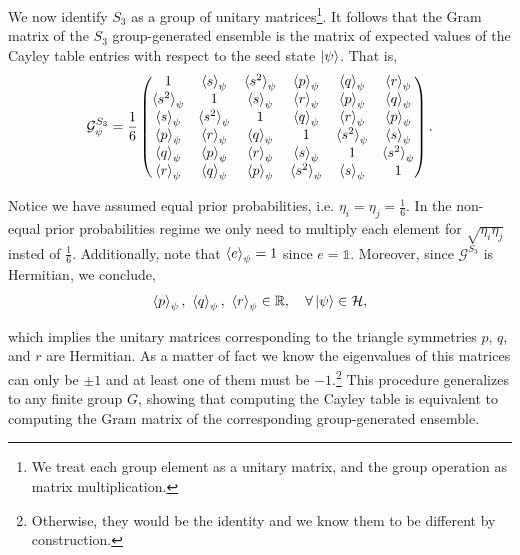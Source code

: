 \documentclass[12pt,letterpaper]{article}
\begin{document}
We now identify $S_3$ as a group of unitary matrices\footnote{We treat each group element as a unitary matrix, and the group operation as matrix multiplication.}. It follows that the Gram matrix of the $S_3$ group-generated ensemble is the matrix of expected values of the Cayley table entries with respect to the seed state $\ket{\psi}$. That is,
\begin{align*}
	\mathcal{G}^{S_3}_{\psi} = \frac{1}{6}\begin{pmatrix}
        1 & \braket{s}_\psi & \braket{s^2}_\psi & \braket{p}_\psi & \braket{q}_\psi & \braket{r}_\psi \\ 
        \braket{s^2}_\psi & 1 & \braket{s}_\psi & \braket{r}_\psi & \braket{p}_\psi & \braket{q}_\psi \\
        \braket{s}_\psi & \braket{s^2}_\psi & 1 & \braket{q}_\psi & \braket{r}_\psi & \braket{p}_\psi \\
        \braket{p}_\psi & \braket{r}_\psi & \braket{q}_\psi & 1 & \braket{s^2}_\psi & \braket{s}_\psi \\
        \braket{q}_\psi & \braket{p}_\psi & \braket{r}_\psi & \braket{s}_\psi & 1 & \braket{s^2}_\psi \\
        \braket{r}_\psi & \braket{q}_\psi & \braket{p}_\psi & \braket{s^2}_\psi & \braket{s}_\psi & 1
	\end{pmatrix}.
\end{align*}

Notice we have assumed equal prior probabilities, i.e. $\eta_i = \eta_j = \frac{1}{6}$. In the non-equal prior probabilities regime we only need to multiply each element for $\sqrt{\eta_i\eta_j}$ insted of $\frac{1}{6}$. Additionally, note that $\braket{e}_\psi = 1$ since $e = \mathds{1}$. Moreover, since $\mathcal{G}^{S_3}$ is Hermitian, we conclude,
\begin{align*}
\braket{p}_{\psi},\ \braket{q}_{\psi},\ \braket{r}_{\psi} \in \mathbb{R}, \quad \forall \ket{\psi} \in \mathcal{H},
\end{align*}

which implies the unitary matrices corresponding to the triangle symmetries $p$, $q$, and $r$ are Hermitian. As a matter of fact we know the eigenvalues of this matrices can only be $\pm 1$ and at least one of them must be $-1$.\footnote{Otherwise, they would be the identity and we know them to be different by construction.} This procedure generalizes to any finite group $G$, showing that computing the Cayley table is equivalent to computing the Gram matrix of the corresponding group-generated ensemble.
\end{document}
